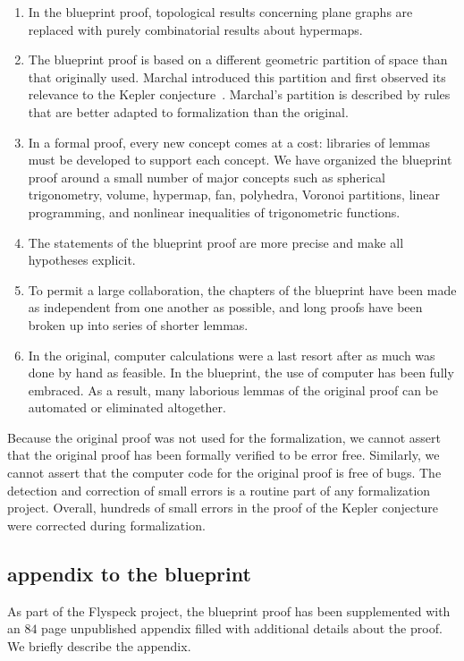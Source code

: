 \begin{enumerate}
\item In the blueprint proof, topological results concerning plane
  graphs are replaced with purely combinatorial results about
  hypermaps.  
\item The blueprint proof is based on a different geometric partition
  of space than that originally used.  Marchal introduced this
  partition and first observed its relevance to the Kepler
  conjecture~\cite{Marchal11}.  Marchal's partition is described by
  rules that are better adapted to formalization than the original.
 \item In a formal proof, every new concept comes at a cost: libraries
   of lemmas must be developed to support each concept.  We have
   organized the blueprint proof around a small number of major
   concepts such as spherical trigonometry, volume, hypermap, fan,
   polyhedra, Voronoi partitions, linear programming, and nonlinear
   inequalities of trigonometric functions.
 \item The statements of the blueprint proof are more precise and
   make all hypotheses explicit.
 \item To permit a large collaboration, the chapters of the
   blueprint have been made as independent from one another as
   possible, and long proofs have been broken up into series of
   shorter lemmas.
\item In
  the original, computer calculations were a last resort after
  as much was done by hand as feasible.
  In the
  blueprint, the use of computer has been fully embraced.  As a
  result, many laborious lemmas of the original proof can be
  automated or eliminated altogether.
\end{enumerate}


Because the original proof was not used for the formalization, we
cannot assert that the original proof has been formally verified to be
error free.  Similarly, we cannot assert that the computer code for
the original proof is free of bugs.  The detection and correction of
small errors is a routine part of any formalization project.  Overall,
hundreds of small errors in the proof of the Kepler conjecture were
corrected during formalization.  

\subsection{appendix to the blueprint}\label{sec:ab}

As part of the Flyspeck project, the blueprint proof has been
supplemented with an $84$ page unpublished appendix filled with
additional details about the proof.   We briefly describe the
appendix.

